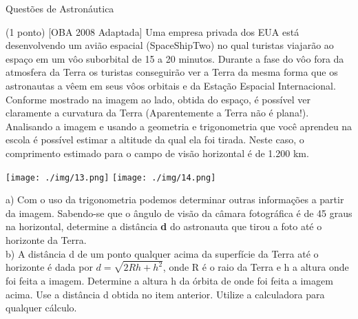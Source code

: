 \documentclass{../lista}
\begin{document}
	\begin{secao}{Questões de Astronáutica}
		\begin{questao}{(1 ponto) [OBA 2008 Adaptada]}
			Uma empresa privada dos EUA está desenvolvendo um avião espacial (SpaceShipTwo) no qual turistas viajarão ao espaço em um vôo suborbital de 15 a 20 minutos. Durante a fase do vôo fora da atmosfera da Terra os turistas conseguirão ver a Terra da mesma forma que os astronautas a vêem em seus vôos orbitais e da Estação Espacial Internacional. Conforme mostrado na imagem ao lado, obtida do espaço, é possível ver claramente a curvatura da Terra (Aparentemente a Terra não é plana!). Analisando a imagem e usando a geometria e trigonometria que você aprendeu na escola é possível estimar a altitude da qual ela foi tirada. Neste caso, o comprimento estimado para o campo de visão horizontal é de 1.200 km.
			
			\begin{center}
				\texttt{[image: ./img/13.png]} \texttt{[image: ./img/14.png]}
			\end{center}
			
			a) Com o uso da trigonometria podemos determinar outras informações a partir da imagem. Sabendo-se que o ângulo de visão da câmara fotográfica é de 45 graus na horizontal, determine a distância \textbf{d} do astronauta que tirou a foto até o horizonte da Terra. \\
			
			b) A distância d de um ponto qualquer acima da superfície da Terra até o horizonte é dada por $d = \sqrt{2 R h + h^{2}}$, onde R é o raio da Terra e h a altura onde foi feita a imagem. Determine a altura h da órbita de onde foi feita a imagem acima. Use a distância d obtida no item anterior. Utilize a calculadora para qualquer cálculo.
			

\end{questao}
\end{secao}
\end{document}
